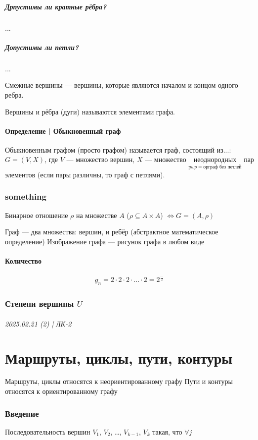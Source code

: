 \documentclass{article}
\begin{document}
\subsubsection{Дрпустимы ли кратные рёбра?}
...

\subsubsection{Допустимы ли петли?}
...

Смежные вершины --- вершины, которые являются началом и концом одного ребра.

Вершины и рёбра (дуги) называются элементами графа.

\subsection{Определение | Обыкновенный граф}
Обыкновенным графом (просто графом) называется граф, состоящий из...: \\
$G = (V, X)$, где 
$V$ --- множество вершин, 
$X$ --- множество $\underset{y w p = \text{орграф без петлей}}{\text{неоднородных}}$ пар элементов (если пары различны, то граф с петлями).

\section{something}
Бинарное отношение $\rho$ на множестве $A$ ($\rho \subseteq A \times A$) $\Leftrightarrow G = (A, \rho)$

Граф --- два множества: вершин, и ребёр (абстрактное математическое определение)
Изображение графа --- рисунок графа в любом виде


\subsection{Количество}
\begin{gather*}
    g_n = 2 \cdot 2 \cdot 2 \cdot \dots \cdot 2 = 2^{\frac{...}{2}}
\end{gather*}



\section{Степени вершины $U$}



\paragraph{2025.02.21 (2) | ЛК-2}
\part{Маршруты, циклы, пути, контуры}
Маршруты, циклы относятся к неориентированному графу
Пути и контуры относятся к ориентированному графу

\section{Введение}
Последовательность вершин $V_1$, $V_2$, \dots, $V_{k-1}$, $V_k$ такая, что $\forall j$
\end{document}
